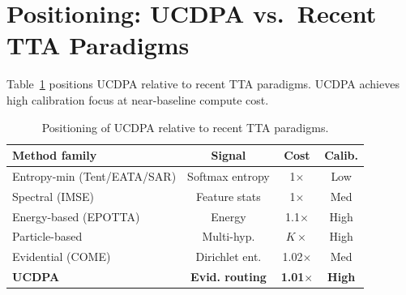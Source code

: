 \section{Positioning: UCDPA vs.\ Recent TTA Paradigms}
\label{app:positioning}

Table~\ref{tab:positioning} positions UCDPA relative to recent TTA paradigms. UCDPA achieves high calibration focus at near-baseline compute cost.

\begin{table}[h]
\centering
\caption{Positioning of UCDPA relative to recent TTA paradigms.}
\label{tab:positioning}
\begin{tabular}{lccc}
\toprule
Method family & Signal & Cost & Calib. \\
\midrule
Entropy-min (Tent/EATA/SAR) & Softmax entropy & 1$\times$ & Low \\
Spectral (IMSE) & Feature stats & 1$\times$ & Med \\
Energy-based (EPOTTA) & Energy & 1.1$\times$ & High \\
Particle-based & Multi-hyp. & $K\times$ & High \\
Evidential (COME) & Dirichlet ent. & 1.02$\times$ & Med \\
\textbf{UCDPA} & \textbf{Evid. routing} & \textbf{1.01$\times$} & \textbf{High} \\
\bottomrule
\end{tabular}
\end{table}
